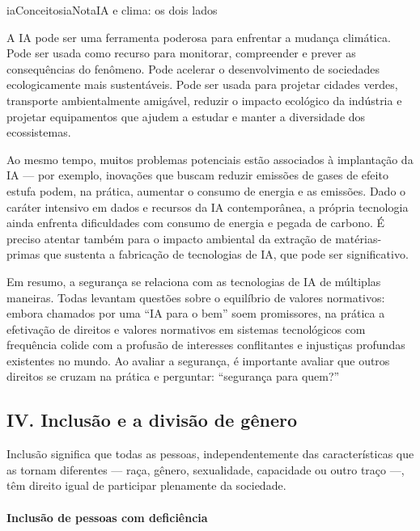 \documentclass[
  11pt,
]{article}
\newenvironment{tecnica}[1][Nota tecnica]{\begin{iabox}{iaConceitos}{iaNota}{#1}}{\end{iabox}}
\begin{document}
\begin{tecnica}[IA e clima: os dois lados]

A IA pode ser uma ferramenta poderosa para enfrentar a mudança
climática. Pode ser usada como recurso para monitorar, compreender e
prever as consequências do fenômeno. Pode acelerar o desenvolvimento de
sociedades ecologicamente mais sustentáveis. Pode ser usada para
projetar cidades verdes, transporte ambientalmente amigável, reduzir o
impacto ecológico da indústria e projetar equipamentos que ajudem a
estudar e manter a diversidade dos ecossistemas.

Ao mesmo tempo, muitos problemas potenciais estão associados à
implantação da IA --- por exemplo, inovações que buscam reduzir emissões
de gases de efeito estufa podem, na prática, aumentar o consumo de
energia e as emissões. Dado o caráter intensivo em dados e recursos da
IA contemporânea, a própria tecnologia ainda enfrenta dificuldades com
consumo de energia e pegada de carbono. É preciso atentar também para o
impacto ambiental da extração de matérias-primas que sustenta a
fabricação de tecnologias de IA, que pode ser significativo.

\end{tecnica}

Em resumo, a segurança se relaciona com as tecnologias de IA de
múltiplas maneiras. Todas levantam questões sobre o equilíbrio de
valores normativos: embora chamados por uma ``IA para o bem'' soem
promissores, na prática a efetivação de direitos e valores normativos em
sistemas tecnológicos com frequência colide com a profusão de interesses
conflitantes e injustiças profundas existentes no mundo. Ao avaliar a
segurança, é importante avaliar que outros direitos se cruzam na prática
e perguntar: ``segurança para quem?''

\subsection{IV. Inclusão e a divisão de
gênero}\label{iv.-inclusuxe3o-e-a-divisuxe3o-de-guxeanero}

Inclusão significa que todas as pessoas, independentemente das
características que as tornam diferentes --- raça, gênero, sexualidade,
capacidade ou outro traço ---, têm direito igual de participar
plenamente da sociedade.

\paragraph{Inclusão de pessoas com
deficiência}\label{inclusuxe3o-de-pessoas-com-deficiuxeancia}
\end{document}
